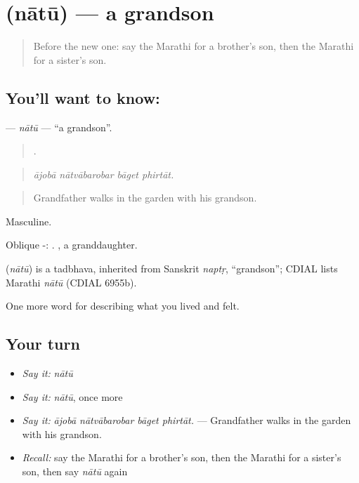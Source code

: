 \section[\texorpdfstring{\mr{नातू} (nātū)}{नातू (nātū)}]{ (nātū) — a grandson}

\label{lesson:MR-C495-natu}



\begin{quote}
Before the new one: say the Marathi for a brother's son, then the Marathi for a sister's son.
\end{quote}

\subsection*{You'll want to know: }
\textbf{} — \emph{nātū} — \textquotedblleft{}a grandson\textquotedblright{}.

\begin{quote}
   .
\end{quote}

\begin{quote}
\emph{ājobā nātvābarobar bāget phirtāt.}
\end{quote}

\begin{quote}
Grandfather walks in the garden with his grandson.
\end{quote}

Masculine.

Oblique -: . , a granddaughter.

\begin{cousinweb}
\textbf{} (\emph{nātū}) is a tadbhava, inherited from Sanskrit \emph{naptṛ}, \textquotedblleft{}grandson\textquotedblright{}; CDIAL lists Marathi \emph{nātū} (CDIAL 6955b).
\end{cousinweb}

\begin{grammarlens}[title={What you've built}]
One more word for describing what you lived and felt.
\end{grammarlens}

\subsection*{Your turn}
\begin{itemize}
\raggedright
  \item \emph{Say it:} \emph{nātū}
  \item \emph{Say it:} \emph{nātū}, once more
  \item \emph{Say it:} \emph{ājobā nātvābarobar bāget phirtāt.} — Grandfather walks in the garden with his grandson.
  \item \emph{Recall:} say the Marathi for a brother's son, then the Marathi for a sister's son, then say \emph{nātū} again
\end{itemize}

